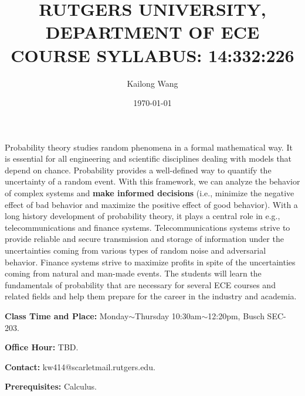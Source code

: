 \documentclass{article}
\title{RUTGERS UNIVERSITY, DEPARTMENT OF ECE \\
COURSE SYLLABUS: 14:332:226}
\author{Kailong Wang}
\date{\today}
\begin{document}
\maketitle
Probability theory studies random phenomena in a formal mathematical way. It is essential for all engineering and scientific disciplines dealing with models that depend on chance.
Probability provides a well-defined way to quantify the uncertainty of a random event. With this framework, we can analyze the behavior of complex systems and \textbf{make informed decisions} (i.e., minimize the negative effect of bad behavior and maximize the positive effect of good behavior).
With a long history development of probability theory, it plays a central role in e.g.,  telecommunications and finance systems. Telecommunications systems strive to provide reliable and secure transmission and storage of information under the uncertainties coming from various types of random noise and adversarial behavior. Finance systems strive to maximize profits in spite of the uncertainties coming from natural and man-made events.
The students will learn the fundamentals of probability that are necessary for several ECE courses and related fields and help them prepare for the career in the industry and academia.

\textbf{Class Time and Place:} Monday$\sim$Thursday 10:30am$\sim$12:20pm, Busch SEC-203.

\textbf{Office Hour:} TBD.

\textbf{Contact:} kw414@scarletmail.rutgers.edu.

\textbf{Prerequisites:} Calculus.
\end{document}
